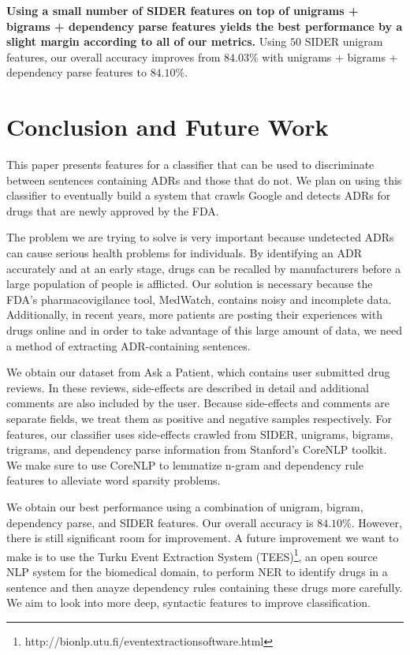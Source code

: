 \documentclass{acm_proc_article-sp}
\begin{document}
\textbf{Using a small number of SIDER features on top of unigrams + bigrams + dependency parse features yields the best performance by a slight margin according to all of our metrics.} Using $50$ SIDER unigram features, our overall accuracy improves from $84.03\%$ with unigrams + bigrams + dependency parse features to $84.10\%$.

\section{Conclusion and Future Work}
This paper presents features for a classifier that can be used to discriminate between sentences containing ADRs and those that do not. We plan on using this classifier to eventually build a system that crawls Google and detects ADRs for drugs that are newly approved by the FDA. 

The problem we are trying to solve is very important because undetected ADRs can cause serious health problems for individuals. By identifying an ADR accurately and at an early stage, drugs can be recalled by manufacturers before a large population of people is afflicted. Our solution is necessary because the FDA's pharmacovigilance tool, MedWatch, contains noisy and incomplete data. Additionally, in recent years, more patients are posting their experiences with drugs online and in order to take advantage of this large amount of data, we need a method of extracting ADR-containing sentences.

We obtain our dataset from Ask a Patient, which contains user submitted drug reviews. In these reviews, side-effects are described in detail and additional comments are also included by the user. Because side-effects and comments are separate fields, we treat them as positive and negative samples respectively. For features, our classifier uses side-effects crawled from SIDER, unigrams, bigrams, trigrams, and dependency parse information from Stanford's CoreNLP toolkit. We make sure to use CoreNLP to lemmatize n-gram and dependency rule features to alleviate word sparsity problems.

We obtain our best performance using a combination of unigram, bigram, dependency parse, and SIDER features. Our overall accuracy is $84.10\%$. However, there is still significant room for improvement. A future improvement we want to make is to use the Turku Event Extraction System (TEES)\footnote{http://bionlp.utu.fi/eventextractionsoftware.html}, an open source NLP system for the biomedical domain, to perform NER to identify drugs in a sentence and then anayze dependency rules containing these drugs more carefully. We aim to look into more deep, syntactic features to improve classification.
\end{document}

